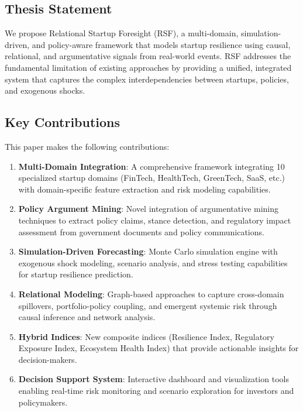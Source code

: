 \subsection{Thesis Statement}

We propose Relational Startup Foresight (RSF), a multi-domain, simulation-driven, and policy-aware framework that models startup resilience using causal, relational, and argumentative signals from real-world events. RSF addresses the fundamental limitation of existing approaches by providing a unified, integrated system that captures the complex interdependencies between startups, policies, and exogenous shocks.

\subsection{Key Contributions}

This paper makes the following contributions:

\begin{enumerate}
    \item \textbf{Multi-Domain Integration}: A comprehensive framework integrating 10 specialized startup domains (FinTech, HealthTech, GreenTech, SaaS, etc.) with domain-specific feature extraction and risk modeling capabilities.
    
    \item \textbf{Policy Argument Mining}: Novel integration of argumentative mining techniques to extract policy claims, stance detection, and regulatory impact assessment from government documents and policy communications.
    
    \item \textbf{Simulation-Driven Forecasting}: Monte Carlo simulation engine with exogenous shock modeling, scenario analysis, and stress testing capabilities for startup resilience prediction.
    
    \item \textbf{Relational Modeling}: Graph-based approaches to capture cross-domain spillovers, portfolio-policy coupling, and emergent systemic risk through causal inference and network analysis.
    
    \item \textbf{Hybrid Indices}: New composite indices (Resilience Index, Regulatory Exposure Index, Ecosystem Health Index) that provide actionable insights for decision-makers.
    
    \item \textbf{Decision Support System}: Interactive dashboard and visualization tools enabling real-time risk monitoring and scenario exploration for investors and policymakers.
\end{enumerate}

